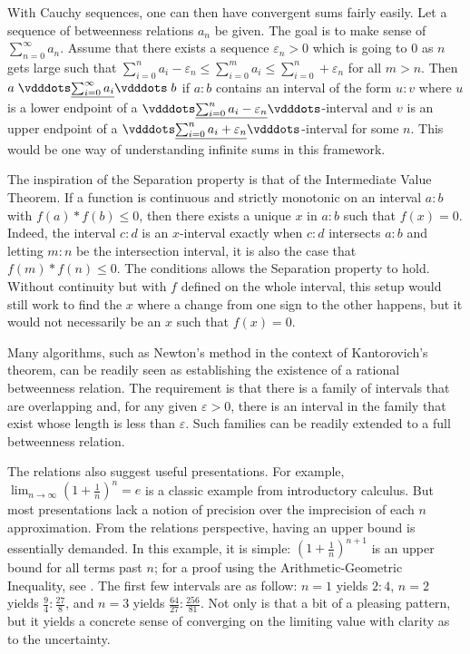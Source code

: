 \documentclass[12pt]{article}
\begin{document}
With Cauchy sequences, one can then have convergent sums fairly easily. Let a sequence of betweenness relations $a_n$ be given. The goal is to make sense of $\sum_{n=0}^{\infty} a_n$. Assume that there exists a sequence $\varepsilon_n > 0$ which is going to 0 as $n$ gets large such that $\sum_{i=0}^n a_i - \varepsilon_n \leq \sum_{i=0}^m a_i \leq \sum_{i=0}^n + \varepsilon_n$ for all $m > n$. Then  $a \xrel[\sum_{i=0}^{\infty} a_i] b$ if $a:b$ contains an interval of the form $u:v$ where $u$ is a lower endpoint of a $\xrel[\sum_{i=0}^n a_i - \varepsilon_n ]$-interval and $v$ is an upper endpoint of a $\xrel[\sum_{i=0}^n a_i + \varepsilon_n ]$-interval for some $n$. This would be one way of understanding infinite sums in this framework. 

The inspiration of the Separation property is that of the Intermediate Value Theorem. If a function is continuous and strictly monotonic on an interval $a:b$ with $f(a)*f(b) \leq 0$, then there exists a unique $x$ in $a:b$ such that $f(x) = 0$. Indeed, the interval $c:d$ is an $x$-interval exactly when $c:d$ intersects $a:b$ and letting $m:n$ be the intersection interval, it is also the case that $f(m)*f(n) \leq 0$. The conditions allows the Separation property to hold. Without continuity but with $f$ defined on the whole interval, this setup would still work to find the $x$ where a change from one sign to the other  happens, but it would not necessarily be an $x$ such that $f(x) = 0$.

Many algorithms, such as Newton's method in the context of Kantorovich's theorem, can be readily seen as establishing the existence of a rational betweenness relation. The requirement is that there is a family of intervals that are overlapping and, for any given $\varepsilon >0$, there is an interval in the family that exist whose length is less than $\varepsilon$. Such families can be readily extended to a full betweenness relation. 

The relations also suggest useful presentations. For example, $\lim_{n \to \infty} (1+\frac{1}{n})^n = e$ is a classic example from introductory calculus. But most presentations lack a notion of precision over the imprecision of each $n$ approximation. From the relations perspective, having an upper bound is essentially demanded. In this example, it is simple: $(1 + \frac{1}{n})^{n+1}$ is an upper bound for all terms past $n$; for a proof using the Arithmetic-Geometric Inequality, see \cite{mend}. The first few intervals are as follow: $n=1$ yields $2:4$, $n=2$ yields $\frac{9}{4}:\frac{27}{8}$, and $n=3$ yields $\frac{64}{27}:\frac{256}{81}$. Not only is that a bit of a pleasing pattern, but it yields a concrete sense of converging on the limiting  value with clarity as to the uncertainty. 
\end{document}
